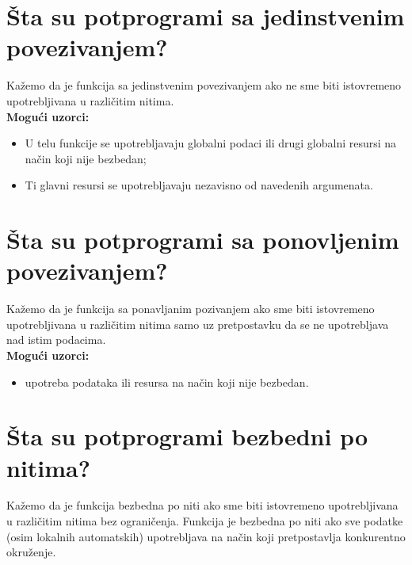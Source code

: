 \documentclass[a4paper]{article}
\begin{document}
\section{Šta su potprogrami sa jedinstvenim povezivanjem?}
  Kažemo da je funkcija sa jedinstvenim povezivanjem ako ne sme biti istovremeno upotrebljivana u 
  različitim nitima.\\
  \textbf{Mogući uzorci:}
    \begin{itemize}
      \item U telu funkcije se upotrebljavaju globalni podaci 
            ili drugi globalni resursi na način koji nije bezbedan;
      \item Ti glavni resursi se upotrebljavaju nezavisno od navedenih argumenata.
    \end{itemize}
\section{Šta su potprogrami sa ponovljenim povezivanjem?}
  Kažemo da je funkcija sa ponavljanim pozivanjem ako sme biti istovremeno upotrebljivana u 
  različitim nitima samo uz pretpostavku da se ne upotrebljava nad istim podacima.\\
  \textbf{Mogući uzorci:}
  \begin{itemize}
    \item upotreba podataka ili resursa na način koji nije bezbedan.
  \end{itemize}
 
\section{Šta su potprogrami bezbedni po nitima?}
  Kažemo da je funkcija bezbedna po niti ako sme biti istovremeno upotrebljivana u 
  različitim nitima bez ograničenja. Funkcija je bezbedna po niti ako sve podatke 
  (osim lokalnih automatskih) upotrebljava na način koji pretpostavlja konkurentno okruženje.
  
\end{document}

